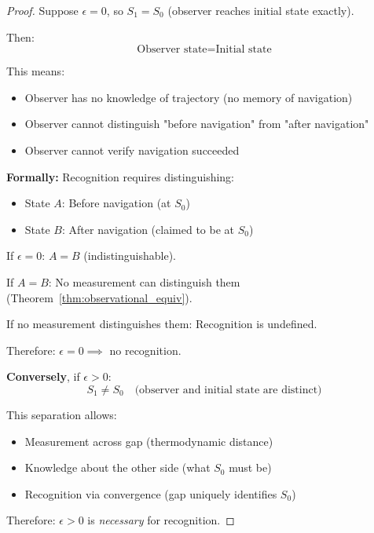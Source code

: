 \documentclass[twocolumn,10pt]{article}
\theoremstyle{definition}
\theoremstyle{remark}
\begin{document}
\begin{proof}
Suppose $\epsilon = 0$, so $S_1 = S_0$ (observer reaches initial state exactly).

Then:
\begin{equation}
\text{Observer state} = \text{Initial state}
\end{equation}

This means:
\begin{itemize}
\item Observer has no knowledge of trajectory (no memory of navigation)
\item Observer cannot distinguish "before navigation" from "after navigation"
\item Observer cannot verify navigation succeeded
\end{itemize}

\vspace{0.2cm}
\noindent\textbf{Formally:} Recognition requires distinguishing:
\begin{itemize}
\item State $A$: Before navigation (at $S_0$)
\item State $B$: After navigation (claimed to be at $S_0$)
\end{itemize}

If $\epsilon = 0$: $A = B$ (indistinguishable).

If $A = B$: No measurement can distinguish them (Theorem~\ref{thm:observational_equiv}).

If no measurement distinguishes them: Recognition is undefined.

Therefore: $\epsilon = 0 \implies$ no recognition.

\vspace{0.2cm}
\noindent\textbf{Conversely}, if $\epsilon > 0$:
\begin{equation}
S_1 \neq S_0 \quad \text{(observer and initial state are distinct)}
\end{equation}

This separation allows:
\begin{itemize}
\item Measurement across gap (thermodynamic distance)
\item Knowledge about the other side (what $S_0$ must be)
\item Recognition via convergence (gap uniquely identifies $S_0$)
\end{itemize}

Therefore: $\epsilon > 0$ is \textit{necessary} for recognition.
\end{proof}
\end{document}
